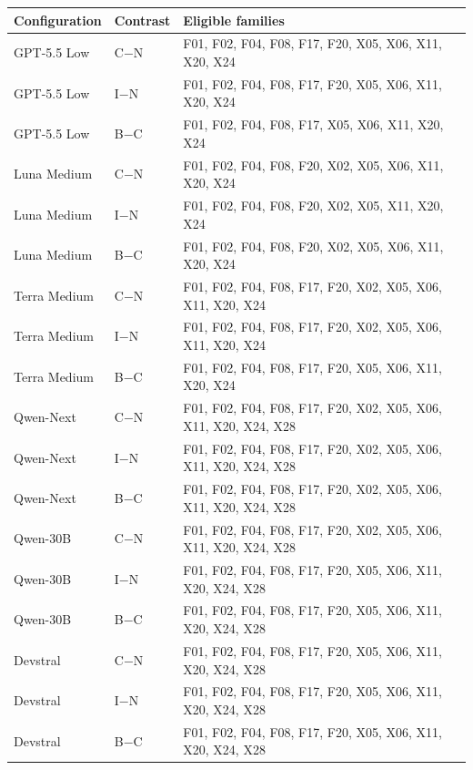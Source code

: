 \begin{tabular}{llp{9cm}}
\toprule
Configuration & Contrast & Eligible families\\
\midrule
GPT-5.5 Low & C$-$N & F01, F02, F04, F08, F17, F20, X05, X06, X11, X20, X24\\
GPT-5.5 Low & I$-$N & F01, F02, F04, F08, F17, F20, X05, X06, X11, X20, X24\\
GPT-5.5 Low & B$-$C & F01, F02, F04, F08, F17, X05, X06, X11, X20, X24\\
Luna Medium & C$-$N & F01, F02, F04, F08, F20, X02, X05, X06, X11, X20, X24\\
Luna Medium & I$-$N & F01, F02, F04, F08, F20, X02, X05, X11, X20, X24\\
Luna Medium & B$-$C & F01, F02, F04, F08, F20, X02, X05, X06, X11, X20, X24\\
Terra Medium & C$-$N & F01, F02, F04, F08, F17, F20, X02, X05, X06, X11, X20, X24\\
Terra Medium & I$-$N & F01, F02, F04, F08, F17, F20, X02, X05, X06, X11, X20, X24\\
Terra Medium & B$-$C & F01, F02, F04, F08, F17, F20, X05, X06, X11, X20, X24\\
Qwen-Next & C$-$N & F01, F02, F04, F08, F17, F20, X02, X05, X06, X11, X20, X24, X28\\
Qwen-Next & I$-$N & F01, F02, F04, F08, F17, F20, X02, X05, X06, X11, X20, X24, X28\\
Qwen-Next & B$-$C & F01, F02, F04, F08, F17, F20, X02, X05, X06, X11, X20, X24, X28\\
Qwen-30B & C$-$N & F01, F02, F04, F08, F17, F20, X02, X05, X06, X11, X20, X24, X28\\
Qwen-30B & I$-$N & F01, F02, F04, F08, F17, F20, X05, X06, X11, X20, X24, X28\\
Qwen-30B & B$-$C & F01, F02, F04, F08, F17, F20, X05, X06, X11, X20, X24, X28\\
Devstral & C$-$N & F01, F02, F04, F08, F17, F20, X05, X06, X11, X20, X24, X28\\
Devstral & I$-$N & F01, F02, F04, F08, F17, F20, X05, X06, X11, X20, X24, X28\\
Devstral & B$-$C & F01, F02, F04, F08, F17, F20, X05, X06, X11, X20, X24, X28\\
\bottomrule
\end{tabular}
